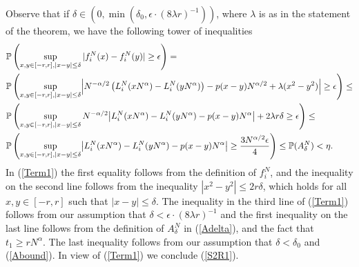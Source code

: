 Observe that if $\delta \in \left (0, \min \left(\delta_0, \epsilon \cdot (8 \lambda r)^{-1} \right) \right)$, where $\lambda$ is as in the statement of the theorem, we have the following tower of inequalities
\begin{equation}\label{Term1}
\begin{split}
&\pr\left(\sup_{{x,y\in [-r,r], |x-y|\leq\delta}} |f^N_i(x) - f^N_i(y)| \geq \epsilon\right) = \\
&\pr\left(\sup_{{x,y\in [-r,r],|x-y|\leq\delta}} \abs*{N^{-\alpha/2}\left(L^N_i(xN^{\alpha}) - L^N_i(yN^\alpha)\right)-p(x-y)N^{\alpha/2}+\lambda(x^2-y^2)} \geq \epsilon\right) \leq \\
&\pr\left(\sup_{{x,y\in [-r,r], |x-y|\leq\delta}} N^{-\alpha/2}\abs*{L_i^N(xN^\alpha)-L_i^N(yN^\alpha)-p(x-y)N^\alpha}+2\lambda r\delta\geq \epsilon\right) \leq \\
& \pr\left(\sup_{{x,y\in [-r,r], |x-y|\leq\delta}} \abs*{L_i^N(xN^\alpha)-L_i^N(yN^\alpha)-p(x-y)N^\alpha}\geq \frac{3N^{\alpha/2}\epsilon}4\right)\leq \mathbb{P}(A^N_\delta) < \eta .
\end{split}
\end{equation}
In (\ref{Term1}) the first equality follows from the definition of $f_i^N$, and the inequality on the second line follows from the inequality $|x^2-y^2|\leq 2r\delta$, which holds for all $x,y \in [-r,r]$ such that $|x-y| \leq \delta$. The inequality in the third line of (\ref{Term1}) follows from our assumption that $\delta <   \epsilon \cdot (8 \lambda r)^{-1}$ and the first inequality on the last line follows from the definition of $A^N_\delta$ in (\ref{Adelta}), and the fact that $t_1 \geq r N^{\alpha}$. The last inequality follows from our assumption that $\delta < \delta_0$ and (\ref{Abound}). In view of (\ref{Term1}) we conclude (\ref{S2R1}).\\


